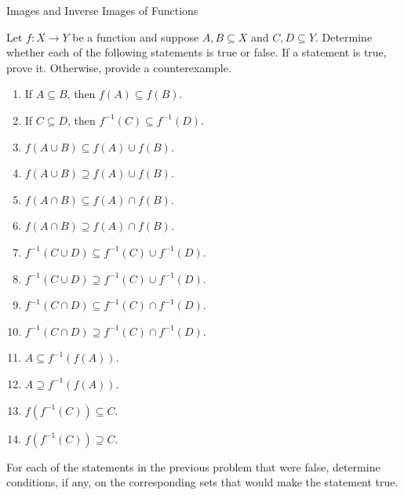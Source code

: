 \begin{section}{Images and Inverse Images of Functions}
\begin{problem}
Let $f:X\to Y$ be a function and suppose $A, B\subseteq X$ and $C, D\subseteq Y$. Determine whether each of the following statements is true or false. If a statement is true, prove it.  Otherwise, provide a counterexample.
\begin{enumerate}[label=\textrm{(\alph*)}]
\item If $A\subseteq B$, then $f(A)\subseteq f(B)$.
\item If $C\subseteq D$, then $f^{-1}(C)\subseteq f^{-1}(D)$.
\item $f(A\cup B)\subseteq f(A)\cup f(B)$.
\item $f(A\cup B)\supseteq f(A)\cup f(B)$.
\item $f(A\cap B)\subseteq f(A)\cap f(B)$.
\item $f(A\cap B)\supseteq f(A)\cap f(B)$.
\item $f^{-1}(C\cup D)\subseteq f^{-1}(C)\cup f^{-1}(D)$.
\item $f^{-1}(C\cup D)\supseteq f^{-1}(C)\cup f^{-1}(D)$.
\item $f^{-1}(C\cap D)\subseteq f^{-1}(C)\cap f^{-1}(D)$.
\item $f^{-1}(C\cap D)\supseteq f^{-1}(C)\cap f^{-1}(D)$.
\item $A\subseteq f^{-1}(f(A))$.
\item $A\supseteq f^{-1}(f(A))$.
\item $f(f^{-1}(C))\subseteq C$.
\item $f(f^{-1}(C))\supseteq C$.
\end{enumerate}
\end{problem}

\begin{problem}
For each of the statements in the previous problem that were false, determine conditions, if any, on the corresponding sets that would make the statement true.
\end{problem}

\end{section}